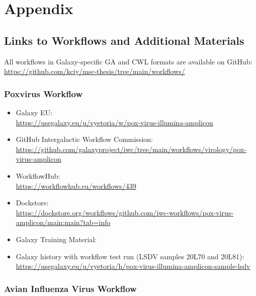 \chapter*{Appendix}
\label{chap:appendix}

\vspace*{-16pt}
\section*{\thesection \quad Links to Workflows and Additional Materials}
\hspace*{-18pt}All workflows in Galaxy-specific GA and CWL formats are available on GitHub:\\
\url{https://github.com/kciy/msc-thesis/tree/main/workflows/}

\subsection*{\thesubsection \quad Poxvirus Workflow}
\label{sec:apx-pox-links}
\begin{itemize}
	\setlength{\itemsep}{-0.4cm}
	\item Galaxy EU:\\
	\url{https://usegalaxy.eu/u/vyetoria/w/pox-virus-illumina-amplicon}
	\item GitHub Intergalactic Workflow Commission:\\
	\url{https://github.com/galaxyproject/iwc/tree/main/workflows/virology/pox-virus-amplicon}
	\item WorkflowHub:\\
	\url{https://workflowhub.eu/workflows/439}
	\item Dockstore:\\
	\url{https://dockstore.org/workflows/github.com/iwc-workflows/pox-virus-amplicon/main:main?tab=info}
	\item Galaxy Training Material: \todoit
	\item Galaxy history with workflow test run (\ac{LSDV} samples 20L70 and 20L81):\\
	\url{https://usegalaxy.eu/u/vyetoria/h/pox-virus-illumina-amplicon-sample-lsdv} 
\end{itemize}

\subsection*{\thesubsection \quad Avian Influenza Virus Workflow}


